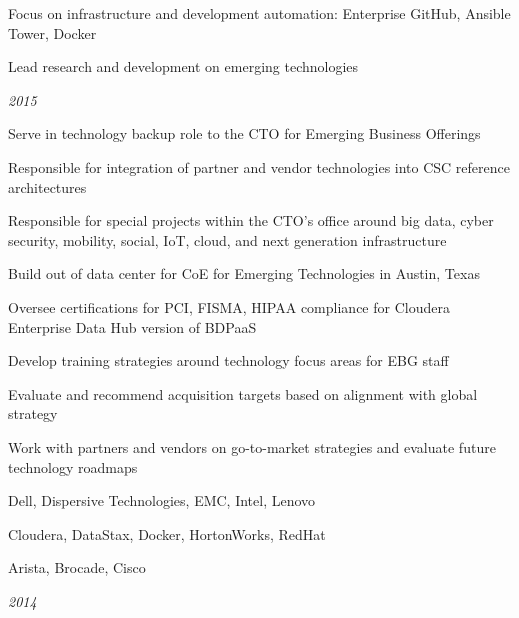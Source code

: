 \begin{itemize}
\begin{itemize*}
                \begin{itemize*}
                  \item Focus on infrastructure and development automation: Enterprise GitHub, Ansible Tower, Docker
                \end{itemize*}
            \item Lead research and development on emerging technologies
        \end{itemize*}
         {\emph{2015}}
        \begin{itemize*}
            \item Serve in technology backup role to the CTO for Emerging Business Offerings
            \item Responsible for integration of partner and vendor technologies into CSC reference architectures
            \item Responsible for special projects within the CTO's office around big data, cyber security, mobility, social, IoT, cloud, and next generation infrastructure
            \begin{itemize*}
              \item Build out of data center for CoE for Emerging Technologies in Austin, Texas
              \item Oversee certifications for PCI, FISMA, HIPAA compliance for Cloudera Enterprise Data Hub version of BDPaaS
              \item Develop training strategies around technology focus areas for EBG staff
            \end{itemize*}
            \item Evaluate and recommend acquisition targets based on alignment with global strategy
            \item Work with partners and vendors on go-to-market strategies and evaluate future technology roadmaps
              \begin{itemize*}
                \item Dell, Dispersive Technologies, EMC, Intel, Lenovo
                \item Cloudera, DataStax, Docker, HortonWorks, RedHat
                \item Arista, Brocade, Cisco
              \end{itemize*}
        \end{itemize*}
         {\emph{2014}}

\end{itemize}
